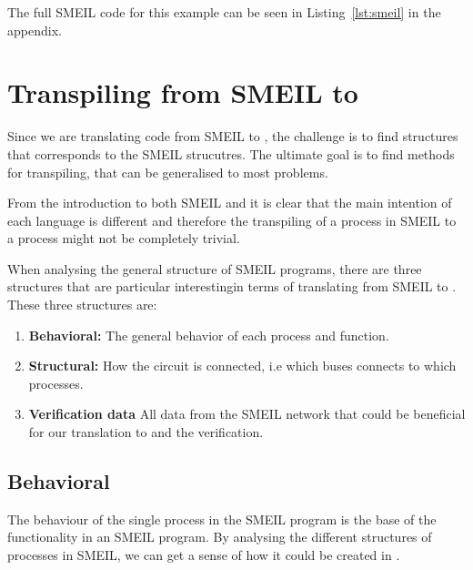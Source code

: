The full SMEIL code for this example can be seen in Listing~\ref{lst:smeil} in  the appendix.

\section{Transpiling from SMEIL to \cspm{}}
\label{sec:transpiling}
Since we are translating code from SMEIL to \cspm{}, the challenge is to find \cspm{} structures that corresponds to the SMEIL strucutres. The ultimate goal is to find methods for transpiling, that can be generalised to most problems.

From the introduction to both SMEIL and \cspm it is clear that the main intention of each language is different and therefore the transpiling of a process in SMEIL to a \cspm process might not be completely trivial.



When analysing the general structure of SMEIL programs, there are three structures that are particular interestingin terms of translating from SMEIL to \cspm{}. These three structures are:
\begin{enumerate}
    \item \textbf{Behavioral:} The general behavior of each process and function.
    \item \textbf{Structural:} How the circuit is connected, i.e which buses connects to which processes.
    \item \textbf{Verification data} All data from the SMEIL network that could be beneficial for our translation to \cspm{} and the verification.
\end{enumerate}
\subsection{Behavioral}
The behaviour of the single process in the SMEIL program is the base of the functionality in an SMEIL program. By analysing the different structures of processes in SMEIL, we can get a sense of how it could be created in \cspm.
